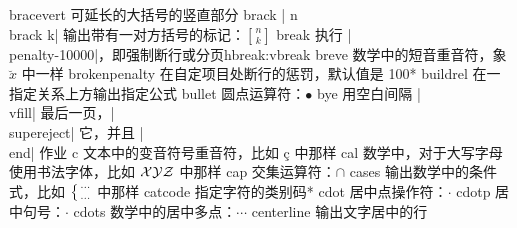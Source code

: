 \capcs bracevert {可延长的大括号的竖直部分}{}{}
\capcs brack {| n\\brack k| 输出带有一对方括号的标记：$n \brack k$}{}{}
\capcstwo break {执行 |\\penalty-10000|，即强制断行或分页}{}{hbreak:vbreak}
\capcs breve {数学中的短音重音符，象 $\breve x$ 中一样}{}{}
\capcs brokenpenalty {在自定项目处断行的惩罚，默认值是 100}*{}
\capcs buildrel {在一指定关系上方输出指定公式}{}{}
\capcs bullet {圆点运算符：$\bullet$}{}{}
\capcs bye {用空白间隔 |\\vfill| 最后一页，|\\supereject| 它，并且 |\\end| 作业}{}{\@bye}
\capcs c {文本中的变音符号重音符，比如 \c c 中那样}{}{}
\capcs cal {数学中，对于大写字母使用书法字体，比如 $\cal XYZ$ 中那样}{}{}
\capcs cap {交集运算符：$\cap$}{}{}
\capcs cases {输出数学中的条件式，比如 $\bigl\{{\cdots\atop\cdots}$ 中那样}{}{}
\capcs catcode {指定字符的类别码}*{}
\capcs cdot {居中点操作符：$\cdot$}{}{}
\capcs cdotp {居中句号：$\cdotp$}{}{}
\capcs cdots {数学中的居中多点：$\cdots$}{}{}
\capcs centerline {输出文字居中的行}{}{}
